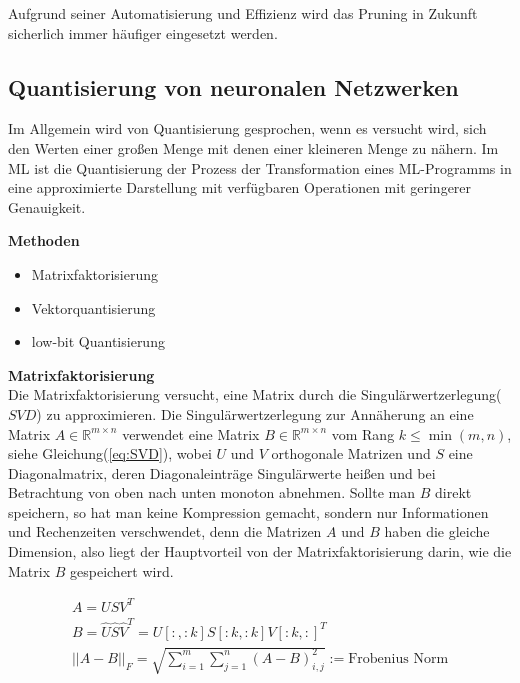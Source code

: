 \documentclass[12pt,a4paper]{scrartcl}
\numberwithin{equation}{section}
\newcommand{\R}{\mathbb{R}} %
\begin{document}
Aufgrund seiner Automatisierung und Effizienz wird das Pruning in Zukunft sicherlich immer häufiger eingesetzt werden.



\subsection{ Quantisierung von neuronalen Netzwerken}
Im Allgemein wird von Quantisierung gesprochen, wenn es versucht wird, sich den Werten einer großen Menge mit denen einer kleineren Menge zu nähern. Im \ac{ML} ist die Quantisierung der Prozess der Transformation eines ML-Programms in eine approximierte Darstellung mit verfügbaren Operationen mit geringerer Genauigkeit.
\begin{center}
	\textbf{Methoden}
	\begin{itemize}
		\item  Matrixfaktorisierung
		\item Vektorquantisierung
		\item low-bit Quantisierung
	\end{itemize}
\end{center}
\textbf{Matrixfaktorisierung}\\
Die Matrixfaktorisierung versucht, eine Matrix durch die Singulärwertzerlegung($ SVD $) zu approximieren.
Die Singulärwertzerlegung zur Annäherung an eine Matrix $ A \in \R^{m\times n} $ verwendet eine Matrix $ B \in \R^{m\times n}  $ vom Rang $ k \le \min(m, n) $, siehe Gleichung(\ref{eq:SVD}), wobei $ U $ und $ V $ orthogonale Matrizen und $ S $ eine Diagonalmatrix, deren Diagonaleinträge Singulärwerte heißen und bei Betrachtung von oben nach unten monoton abnehmen. Sollte man $ B $ direkt speichern, so hat man keine Kompression gemacht, sondern nur Informationen und Rechenzeiten verschwendet, denn die Matrizen $ A $ und $ B $ haben die gleiche Dimension, also liegt der Hauptvorteil von der Matrixfaktorisierung darin, wie die Matrix $ B $ gespeichert wird.

\begin{equation}\label{eq:SVD}
	\begin{array}{l}
	A = USV^T\\
	B = \widehat{U}\widehat{S}\widehat{V}^T =  U[:,:k] S[:k,:k] V[:k, :]^T \\
	{||A - B||_F} = \sqrt{\sum_{i = 1}^{m} \sum_{j =1}^{n} (A-B)_{i,j}^2} := \text{Frobenius Norm}
	\end{array}	
\end{equation}
\end{document}
